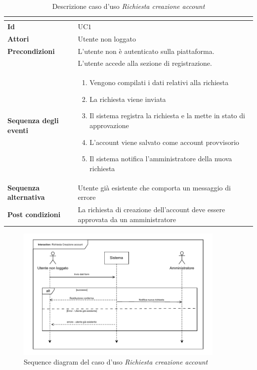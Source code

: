 \documentclass[a4paper]{article}
\begin{document}
\begin{table}[H]
    \centering
    \renewcommand{\arraystretch}{1.5}
    \begin{tabular}{|>{\bfseries}l|p{10cm}|}
        \hline
        \multicolumn{2}{|c|}{\textbf{Caso d'uso: Richiesta creazione account}} \\
        \hline
        \textbf{Id} & UC$1$ \\ \hline
        \textbf{Attori} & Utente non loggato \\ \hline
        \textbf{Precondizioni} & L’utente non è autenticato sulla piattaforma. \\
        & L’utente accede alla sezione di registrazione. \\ \hline %
        \textbf{Sequenza degli eventi} &
        \begin{enumerate}
            \item Vengono compilati i dati relativi alla richiesta
            \item La richiesta viene inviata
            \item Il sistema registra la richiesta e la mette in stato di approvazione
            \item L'account viene salvato come account provvisorio
            \item Il sistema notifica l’amministratore della nuova richiesta
        \end{enumerate}\\ \hline
        \textbf{Sequenza alternativa } & Utente già esistente che comporta un messaggio di errore \\ \hline
        \textbf{Post condizioni} & La richiesta di creazione dell'account deve essere approvata da un amministratore \\ \hline
    \end{tabular}
    \caption{Descrizione caso d'uso \textit{Richiesta creazione account}}
    \label{tab:request_account-usecase}
\end{table}

\begin{figure}[H]
    \centering
    \includegraphics[width=0.9\textwidth]{./figures/account_request_sd}
    \caption{Sequence diagram del caso d'uso \textit{Richiesta creazione account}}
    \label{fig:sd_request_account}
\end{figure}
\end{document}
